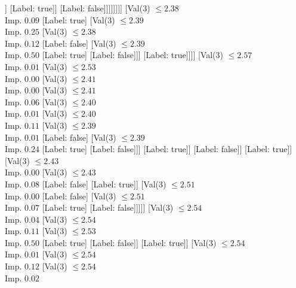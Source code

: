 \documentclass[margin=10pt]{standalone}
\begin{document}
\begin{forest}
																		]
																	[Label: true]]
																[Label: false]]]]]]]]
									[Val($3$) $ \leq 2.38$ \\ Imp. $0.09$
										[Label: true]
										[Val($3$) $ \leq 2.39$ \\ Imp. $0.25$
											[Val($3$) $ \leq 2.38$ \\ Imp. $0.12$
												[Label: false]
												[Val($3$) $ \leq 2.39$ \\ Imp. $0.50$
													[Label: true]
													[Label: false]]]
											[Label: true]]]]
								[Val($3$) $ \leq 2.57$ \\ Imp. $0.01$
									[Val($3$) $ \leq 2.53$ \\ Imp. $0.00$
										[Val($3$) $ \leq 2.41$ \\ Imp. $0.00$
											[Val($3$) $ \leq 2.41$ \\ Imp. $0.06$
												[Val($3$) $ \leq 2.40$ \\ Imp. $0.01$
													[Val($3$) $ \leq 2.40$ \\ Imp. $0.11$
														[Val($3$) $ \leq 2.39$ \\ Imp. $0.01$
															[Label: false]
															[Val($3$) $ \leq 2.39$ \\ Imp. $0.24$
																[Label: true]
																[Label: false]]]
														[Label: true]]
													[Label: false]]
												[Label: true]]
											[Val($3$) $ \leq 2.43$ \\ Imp. $0.00$
												[Val($3$) $ \leq 2.43$ \\ Imp. $0.08$
													[Label: false]
													[Label: true]]
												[Val($3$) $ \leq 2.51$ \\ Imp. $0.00$
													[Label: false]
													[Val($3$) $ \leq 2.51$ \\ Imp. $0.07$
														[Label: true]
														[Label: false]]]]]
										[Val($3$) $ \leq 2.54$ \\ Imp. $0.04$
											[Val($3$) $ \leq 2.54$ \\ Imp. $0.11$
												[Val($3$) $ \leq 2.53$ \\ Imp. $0.50$
													[Label: true]
													[Label: false]]
												[Label: true]]
											[Val($3$) $ \leq 2.54$ \\ Imp. $0.01$
												[Val($3$) $ \leq 2.54$ \\ Imp. $0.12$
													[Val($3$) $ \leq 2.54$ \\ Imp. $0.02$

\end{forest}
\end{document}
